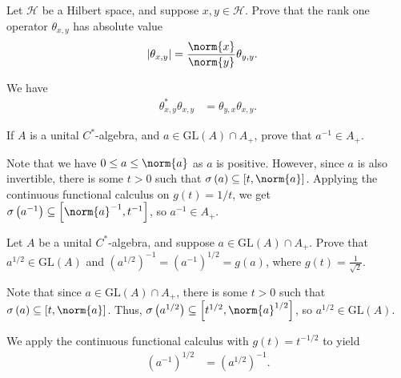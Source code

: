 \documentclass[10pt]{mypackage}
\newcommand{\GL}{\text{GL}}
\begin{document}
\begin{exercise}
  Let $\mathcal{H}$ be a Hilbert space, and suppose $x,y\in \mathcal{H}$. Prove that the rank one operator $\theta_{x,y}$ has absolute value
  \begin{align*}
    \left\vert \theta_{x,y} \right\vert &= \frac{\norm{x}}{\norm{y}} \theta_{y,y}.
  \end{align*}
\end{exercise}
\begin{solution}
  We have
  \begin{align*}
    \theta_{x,y}^{\ast}\theta_{x,y} &= \theta_{y,x}\theta_{x,y}.
  \end{align*}
\end{solution}
\begin{exercise}
  If $A$ is a unital $C^{\ast}$-algebra, and $a\in \GL\left(A\right)\cap A_{+}$, prove that $a^{-1}\in A_{+}$.
\end{exercise}
\begin{solution}
  Note that we have $0\leq a \leq \norm{a}$ as $a$ is positive. However, since $a$ is also invertible, there is some $t > 0$ such that $\sigma\left(a\right)\subseteq \left[t,\norm{a}\right]$. Applying the continuous functional calculus on $g(t) = 1/t$, we get $\sigma\left(a^{-1}\right) \subseteq \left[\norm{a}^{-1},t^{-1}\right]$, so $a^{-1}\in A_{+}$.
\end{solution}
\begin{exercise}
  Let $A$ be a unital $C^{\ast}$-algebra, and suppose $a\in \GL\left(A\right)\cap A_{+}$. Prove that $a^{1/2}\in \GL\left(A\right)$ and $\left(a^{1/2}\right)^{-1} = \left(a^{-1}\right)^{1/2} = g\left(a\right)$, where $g(t) = \frac{1}{\sqrt{2}}$.
\end{exercise}
\begin{solution}
  Note that since $a\in \GL\left(A\right)\cap A_{+}$, there is some $t > 0$ such that $\sigma\left(a\right)\subseteq \left[t,\norm{a}\right]$. Thus, $\sigma\left(a^{1/2}\right) \subseteq \left[t^{1/2},\norm{a}^{1/2}\right]$, so $a^{1/2}\in \GL\left(A\right)$.\newline

  We apply the continuous functional calculus with $g\left(t\right) = t^{-1/2}$ to yield
  \begin{align*}
    \left(a^{-1}\right)^{1/2} &= \left(a^{1/2}\right)^{-1}.
  \end{align*}
\end{solution}
\end{document}
